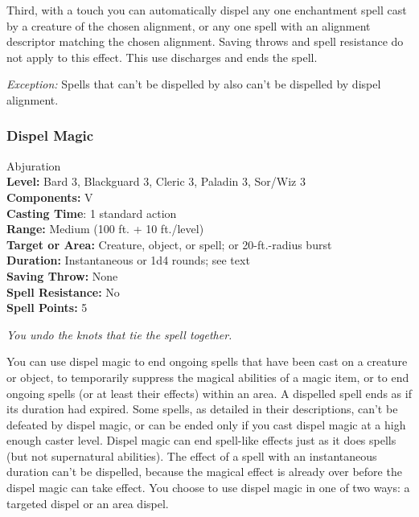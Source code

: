 Third, with a touch you can automatically dispel any one enchantment spell cast by a creature of the chosen alignment, or any one spell with an alignment descriptor matching the chosen alignment. 
Saving throws and spell resistance do not apply to this effect. 
This use discharges and ends the spell.

\emph{Exception:} Spells that can't be dispelled by  also can't be dispelled by dispel alignment. 
\subsubsection{Dispel Magic}
\label{Spell:DispelMagic}
Abjuration
\\ \textbf{Level:} Bard 3, Blackguard 3, Cleric 3, Paladin 3, Sor/Wiz 3
\\ \textbf{Components:} V
\\ \textbf{Casting Time}: 1 standard action
\\ \textbf{Range:} Medium (100 ft. + 10 ft./level)
\\ \textbf{Target or Area:} Creature, object, or spell; or 20-ft.-radius burst
\\ \textbf{Duration:} Instantaneous or 1d4 rounds; see text
\\ \textbf{Saving Throw:} None
\\ \textbf{Spell Resistance:} No
\\ \textbf{Spell Points:} 5

\emph{You undo the knots that tie the spell together.}

You can use dispel magic to end ongoing spells that have been cast on a creature or object, to temporarily suppress the magical abilities of a magic item, or to end ongoing spells (or at least their effects) within an area. 
A dispelled spell ends as if its duration had expired. 
Some spells, as detailed in their descriptions, can't be defeated by dispel magic, or can be ended only if you cast dispel magic at a high enough caster level. 
Dispel magic can end spell-like effects just as it does spells (but not supernatural abilities).
The effect of a spell with an instantaneous duration can't be dispelled, because the magical effect is already over before the dispel magic can take effect.
You choose to use dispel magic in one of two ways: a targeted dispel or an area dispel.

